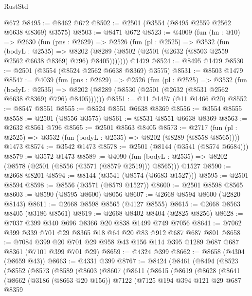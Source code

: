\begin{lexlean}{RustStd}
\begin{coremodule}
{\begin{coremodule}
{{{{{{{{{{{{{{{{{{{{    @672
@8495 := @8462 @672
@8502 := @2501 (@3554 (@8495 @2559 @2562 @6638 @8369) @3575)
@8503 := @8471 @672
@8523 := @4009
    (fun (hn : @10) =>
    @2630
      (fun (pns : @2629) =>
      @2526
        (fun (pl : @2525) =>
        @3532
          (fun (bodyL : @2535) =>
          @8202 (@8289 (@8502 (@2501 (@2632 (@8503 @2559 @2562 @6638 @8369) @796) @8405)))))))
    @1479
@8524 := @8495 @1479
@8530 := @2501 (@3554 (@8524 @2562 @6638 @8369) @3575)
@8531 := @8503 @1479
@8547 := @4039
    (fun (pns : @2629) =>
    @2526
      (fun (pl : @2525) =>
      @3532
        (fun (bodyL : @2535) =>
        @8202 (@8289 (@8530 (@2501 (@2632 (@8531 @2562 @6638 @8369) @796) @8405))))))
@8551 := @11 @1457 (@11 @1466 @20)
@8552 := @8547 @8551
@8555 := @8524 @8551 @6638 @8369
@8556 := @3554 @8555
@8558 := @2501 (@8556 @3575)
@8561 := @8531 @8551 @6638 @8369
@8563 := @2632 @8561 @796
@8565 := @2501 @8563 @8405
@8573 := @2717
    (fun (pl : @2525) => @3532 (fun (bodyL : @2535) => @8202 (@8289 (@8558 @8565))))
    @1473
@8574 := @3542 @1473
@8578 := @2501 (@8144 (@3541 (@8574 @6684)))
@8579 := @3572 @1473
@8589 := @4090
    (fun (bodyL : @2535) => @8202 (@8578 (@2501 (@8556 (@3571 (@8579 @2519))) @8565)))
    @1527
@8590 := @2668 @8201
@8594 := @8144 (@3541 (@8574 (@6683 @1527)))
@8595 := @2501 @8594
@8598 := @8556 (@3571 (@8579 @1527))
@8600 := @2501 @8598 @8565
@8603 := @8590 (@8595 @8600) @8056
@8607 := @2668 @8594 @8600 (@2820 @8143)
@8611 := @2668 @8598 @8565 (@4127 @8555)
@8615 := @2668 @8563 @8405 (@3186 @8561)
@8619 := @2668 @8402 @8404 (@2825 @8256)
@8628 := @7037 @399 @340 @696 @8366 @20 @838 @1499 @749 @7056
@8641 := @7062 @399 @339 @701 @29 @8365 @18 @64 @20 @83 @912 @687 @687 @801
@8658 := @7084 @399 @20 @701 @29 @958 @43 @156 @114 @395 @1289 @687 @687 @8361 (@7101 @399 @701 @29)
@8659 := @4324 @399
@8662 := @8658 (@4304 (@8659 @43))
@8663 := @4331 @399
@8767 := @8424
    (@8461
      (@8494
        (@8523
          (@8552
            (@8573
              (@8589
                (@8603
                  (@8607
                    (@8611
                      (@8615
                        (@8619
                          (@8628
                            (@8641
                              (@8662
                                (@3186 (@8663 @20 @156))
                                @7122
                                (@7125
                                  @194
                                  @394
                                  @121
                                  @29
                                  @687
                                  @8359
}}}}}}}}}}}}}}}}}}}}
\end{coremodule}}
\end{coremodule}
\end{lexlean}
